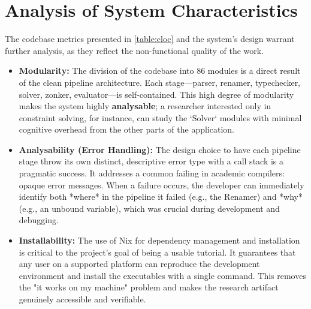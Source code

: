 \section{Analysis of System Characteristics}
\label{sec:Discussion:Characteristics}

The codebase metrics presented in \cref{table:cloc} and the system's design warrant further analysis, as they reflect the non-functional quality of the work.

\begin{itemize}
    \item \textbf{Modularity:} The division of the codebase into 86 modules is a direct result of the clean pipeline architecture. Each stage—parser, renamer, typechecker, solver, zonker, evaluator—is self-contained. This high degree of modularity makes the system highly \textbf{analysable}; a researcher interested only in constraint solving, for instance, can study the `Solver` modules with minimal cognitive overhead from the other parts of the application.

    \item \textbf{Analysability (Error Handling):} The design choice to have each pipeline stage throw its own distinct, descriptive error type with a call stack is a pragmatic success. It addresses a common failing in academic compilers: opaque error messages. When a failure occurs, the developer can immediately identify both *where* in the pipeline it failed (e.g., the Renamer) and *why* (e.g., an unbound variable), which was crucial during development and debugging.

    \item \textbf{Installability:} The use of Nix for dependency management and installation is critical to the project's goal of being a usable tutorial. It guarantees that any user on a supported platform can reproduce the development environment and install the executables with a single command. This removes the "it works on my machine" problem and makes the research artifact genuinely accessible and verifiable.
\end{itemize}

